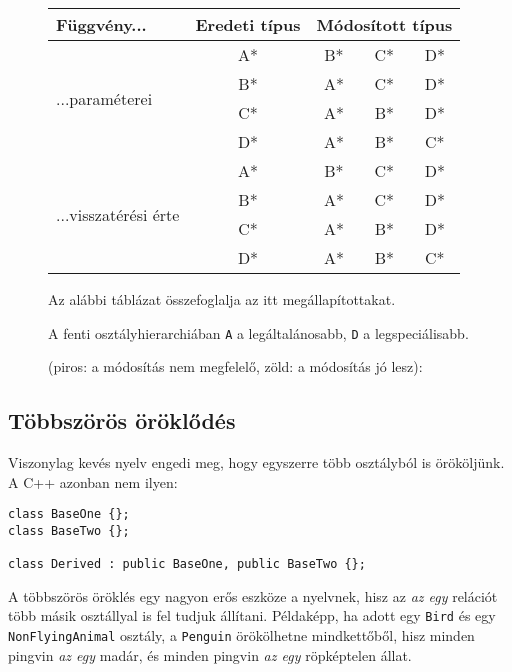 \documentclass[a4paper,11.5pt,table]{article}
\begin{document}
	\begin{figure}
		\centering
		\medskip
		
		\setlength{\extrarowheight}{2pt}
		\begin{tabular}{|l||c|c|c|c|}
			\hline
			Függvény...&Eredeti típus&\multicolumn{3}{c|}{Módosított típus}\\
			\hline
			\hline
			\multirow{4}{*}{...paraméterei}&A*&\cellcolor{red!20}B*&\cellcolor{red!20}C*&\cellcolor{red!20}D*\\
			\cline{2-5}
			&B*&\cellcolor{green!20}A*&\cellcolor{red!20}C*&\cellcolor{red!20}D*\\
			\cline{2-5}
			&C*&\cellcolor{green!20}A*&\cellcolor{green!20}B*&\cellcolor{red!20}D*\\
			\cline{2-5}
			&D*&\cellcolor{green!20}A*&\cellcolor{green!20}B*&\cellcolor{green!20}C*\\
			\hline
			\hline
			\multirow{4}{*}{...visszatérési érte}&A*&\cellcolor{green!20}B*&\cellcolor{green!20}C*&\cellcolor{green!20}D*\\
			\cline{2-5}
			&B*&\cellcolor{red!20}A*&\cellcolor{green!20}C*&\cellcolor{green!20}D*\\
			\cline{2-5}
			&C*&\cellcolor{red!20}A*&\cellcolor{red!20}B*&\cellcolor{green!20}D*\\
			\cline{2-5}
			&D*&\cellcolor{red!20}A*&\cellcolor{red!20}B*&\cellcolor{red!20}C*\\
			\hline
		\end{tabular}
		\smallskip
	
		Az alábbi táblázat összefoglalja az itt megállapítottakat.
		
		A fenti osztályhierarchiában \texttt{A} a legáltalánosabb, \texttt{D} a legspeciálisabb.
		
		(piros: a módosítás nem megfelelő, zöld: a módosítás jó lesz):
	\end{figure}
	\subsection{Többszörös öröklődés}
	Viszonylag kevés nyelv engedi meg, hogy egyszerre több osztályból is örököljünk. A C++ azonban nem ilyen:
	\begin{lstlisting}
class BaseOne {};
class BaseTwo {};

class Derived : public BaseOne, public BaseTwo {};
	\end{lstlisting}
	A többszörös öröklés egy nagyon erős eszköze a nyelvnek, hisz az \textit{az egy} relációt több másik osztállyal is fel tudjuk állítani. Példaképp, ha adott egy \texttt{Bird} és egy \texttt{NonFlyingAnimal} osztály, a \texttt{Penguin} örökölhetne mindkettőből, hisz minden pingvin \textit{az egy} madár, és minden pingvin \textit{az egy} röpképtelen állat.
	
\end{document}
